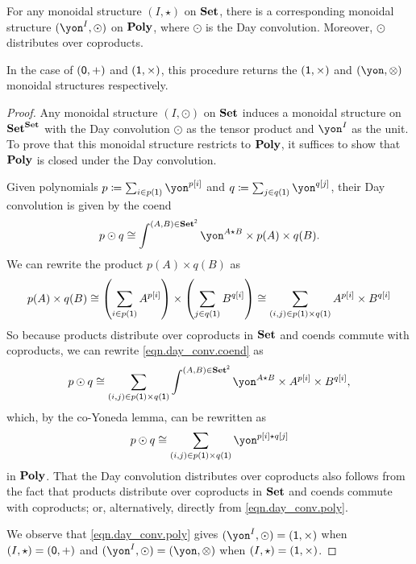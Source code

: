 \documentclass[Book-Poly]{subfiles}
\begin{document}
\begin{proposition} \label{prop.day}
For any monoidal structure $(I,\star)$ on $\mathbf{Set}$, there is a corresponding monoidal structure $(\yon^I, \odot)$ on $\mathbf{Poly}$, where $\odot$ is the Day convolution.
Moreover, $\odot$ distributes over coproducts. 

In the case of $(\textsf{0},+)$ and $(\textsf{1},\times)$, this procedure returns the $(\textsf{1},\times)$ and $(\yon,\otimes)$ monoidal structures respectively.
\end{proposition}
\begin{proof}
Any monoidal structure $(I, \odot)$ on $\mathbf{Set}$ induces a monoidal structure on $\mathbf{Set}^{\mathbf{Set}}$ with the Day convolution $\odot$ as the tensor product and $\yon^I$ as the unit.
To prove that this monoidal structure restricts to $\mathbf{Poly}$, it suffices to show that $\mathbf{Poly}$ is closed under the Day convolution.

Given polynomials $p\coloneqq\sum_{i \in p(\1)} \yon^{p[i]}$ and $q\coloneqq\sum_{j \in q(\1)} \yon^{q[j]}$, their Day convolution is given by the coend
\begin{equation} \label{eqn.day_conv.coend}
    p \odot q \iso \int^{(A,B)\in\smset^\2} \yon^{A \star B} \times p(A) \times q(B).
\end{equation}
We can rewrite the product $p(A) \times q(B)$ as
\[
    p(A) \times q(B) \iso \left(\sum_{i \in p(\1)} A^{p[i]}\right) \times \left(\sum_{j \in q(\1)} B^{q[i]}\right) \iso \sum_{(i,j) \in p(\1) \times q(\1)} A^{p[i]} \times B^{q[i]} %
\]
So because products distribute over coproducts in $\mathbf{Set}$ and coends commute with coproducts, we can rewrite \eqref{eqn.day_conv.coend} as
\[
    p \odot q \iso \sum_{(i,j) \in p(\1) \times q(\1)} \int^{(A,B)\in\smset^\2} \yon^{A \star B} \times A^{p[i]} \times B^{q[i]},
\]
which, by the co-Yoneda lemma, can be rewritten as
\begin{equation} \label{eqn.day_conv.poly}
    p \odot q \iso \sum_{(i,j) \in p(\1) \times q(\1)} \yon^{p[i] \star q[j]}
\end{equation}
in $\mathbf{Poly}$.
That the Day convolution distributes over coproducts also follows from the fact that products distribute over coproducts in $\mathbf{Set}$ and coends commute with coproducts; or, alternatively, directly from \eqref{eqn.day_conv.poly}.

We observe that \eqref{eqn.day_conv.poly} gives $(\yon^I, \odot) = (\1, \times)$ when $(I, \star) = (\textsf{0}, +)$ and $(\yon^I, \odot) = (\yon, \otimes)$ when $(I, \star) = (\textsf{1}, \times)$.
\end{proof}
\end{document}

